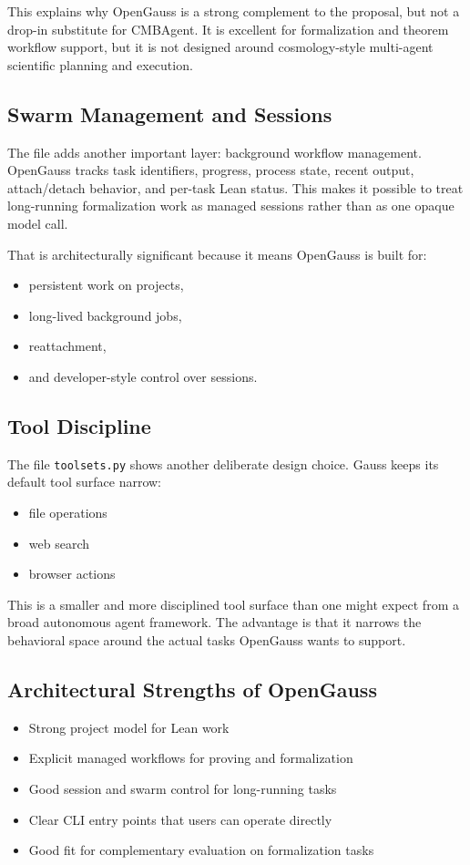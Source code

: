 \documentclass[11pt,a4paper]{article}
\begin{document}
This explains why OpenGauss is a strong complement to the proposal, but not a
drop-in substitute for CMBAgent. It is excellent for formalization and theorem
workflow support, but it is not designed around cosmology-style multi-agent
scientific planning and execution.

\subsection{Swarm Management and Sessions}
The file  adds another important layer: background
workflow management. OpenGauss tracks task identifiers, progress, process state,
recent output, attach/detach behavior, and per-task Lean status. This makes it
possible to treat long-running formalization work as managed sessions rather
than as one opaque model call.

That is architecturally significant because it means OpenGauss is built for:
\begin{itemize}[leftmargin=1.5em]
\item persistent work on projects,
\item long-lived background jobs,
\item reattachment,
\item and developer-style control over sessions.
\end{itemize}

\subsection{Tool Discipline}
The file \texttt{toolsets.py} shows another deliberate design choice. Gauss
keeps its default tool surface narrow:
\begin{itemize}[leftmargin=1.5em]
\item file operations
\item web search
\item browser actions
\end{itemize}

This is a smaller and more disciplined tool surface than one might expect from
a broad autonomous agent framework. The advantage is that it narrows the
behavioral space around the actual tasks OpenGauss wants to support.

\subsection{Architectural Strengths of OpenGauss}
\begin{itemize}[leftmargin=1.5em]
\item Strong project model for Lean work
\item Explicit managed workflows for proving and formalization
\item Good session and swarm control for long-running tasks
\item Clear CLI entry points that users can operate directly
\item Good fit for complementary evaluation on formalization tasks
\end{itemize}
\end{document}
